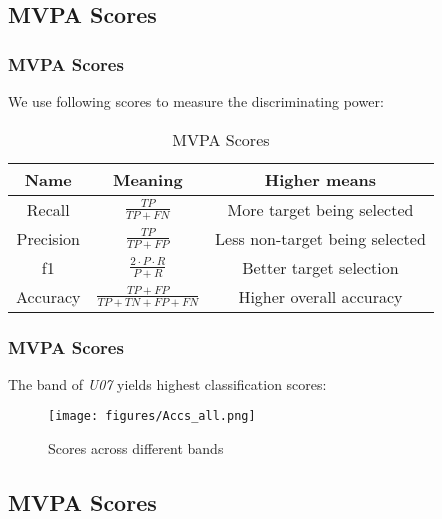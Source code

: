\documentclass[aspectratio=169]{beamer}
\begin{document}
\subsection{MVPA Scores}

\begin{frame}
    \frametitle{MVPA Scores}
    We use following scores to measure the discriminating power:

    \begin{table}
        \renewcommand{\arraystretch}{1.5}
        \caption{MVPA Scores}

        \begin{tabular}{|c|c|c|}
            \hline
            \textbf{Name} & \textbf{Meaning}                       & \textbf{Higher means}          \\
            \hline
            \hline
            Recall        & $ \frac{TP}{TP+FN} $                   & More target being selected     \\
            \hline
            Precision     & $ \frac{TP}{TP+FP} $                   & Less non-target being selected \\
            \hline
            f1            & $ \frac{2 \cdot P \cdot R}{\ P+R \ } $ & Better target selection        \\
            \hline
            Accuracy      & $ \frac{TP+FP}{TP+TN+FP+FN} $          & Higher overall accuracy        \\
            \hline
        \end{tabular}

    \end{table}

\end{frame}

\begin{frame}
    \frametitle{MVPA Scores}
    The band of \emph{U07} yields highest classification scores:

    \begin{figure}[h]
        \centering
        \texttt{[image: figures/Accs\_all.png]}
        \caption{Scores across different bands}
    \end{figure}

\end{frame}

\subsection{MVPA Scores}
\end{document}
